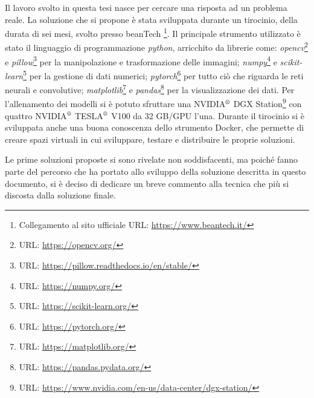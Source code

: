 Il lavoro svolto in questa tesi nasce per cercare una risposta ad un problema reale.
La soluzione che si propone è stata sviluppata durante un tirocinio, della durata di sei mesi, svolto presso beanTech \footnote{Collegamento al sito ufficiale URL: \url{https://www.beantech.it/}}.
Il principale strumento utilizzato è stato il linguaggio di programmazione \textit{python}, arricchito da librerie come:
\textit{opencv}\footnote{URL: \url{https://opencv.org/}} e \textit{pillow}\footnote{URL: \url{https://pillow.readthedocs.io/en/stable/}} per la manipolazione e trasformazione delle immagini; 
\textit{numpy}\footnote{URL: \url{https://numpy.org/}} e \textit{scikit-learn}\footnote{URL: \url{https://scikit-learn.org/}} per la gestione di dati numerici;
\textit{pytorch}\footnote{URL: \url{https://pytorch.org/}} per tutto ciò che riguarda le reti neurali e convolutive;
\textit{matplotlib}\footnote{URL: \url{https://matplotlib.org/}} e \textit{pandas}\footnote{URL: \url{https://pandas.pydata.org/}} per la visualizzazione dei dati.
Per l'allenamento dei modelli si è potuto sfruttare una NVIDIA$^{\text{\textregistered}}$ DGX Station\footnote{URL: \url{https://www.nvidia.com/en-us/data-center/dgx-station/}} con quattro NVIDIA$^{\text{\textregistered}}$ TESLA$^{\text{\textregistered}}$ V100 da 32 GB/GPU l'una.
Durante il tirocinio si è sviluppata anche una buona conoscenza dello strumento Docker, che permette di creare spazi virtuali in cui sviluppare, testare e distribuire le proprie soluzioni.

Le prime soluzioni proposte si sono rivelate non soddisfacenti, ma poiché fanno parte del percorso che ha portato allo sviluppo della soluzione descritta in questo documento, si è deciso di dedicare un breve commento alla tecnica che più si discosta dalla soluzione finale.

